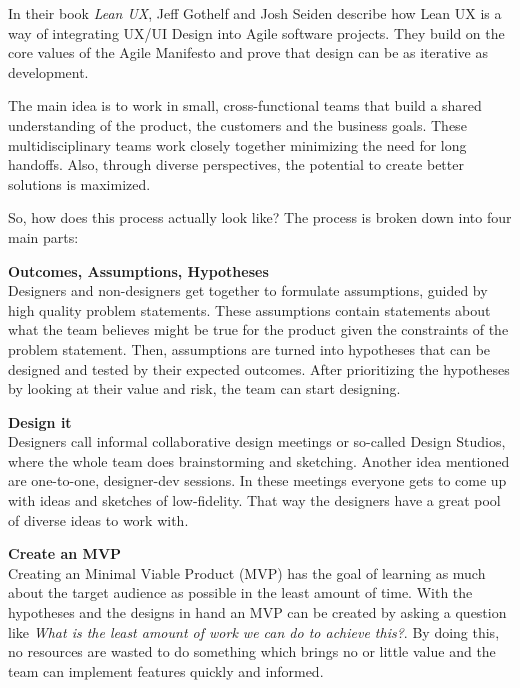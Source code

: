 In their book \textit{Lean UX}, Jeff Gothelf and Josh Seiden describe how Lean UX is a way of
integrating UX/UI Design into Agile software projects. They build on the core values of the Agile
Manifesto and prove that design can be as iterative as development.

The main idea is to work in small, cross-functional teams that build a shared understanding of the
product, the customers and the business goals. These multidisciplinary teams work closely together
minimizing the need for long handoffs. Also, through diverse perspectives, the potential to create
better solutions is maximized. 

So, how does this process actually look like? The process is broken down into four main parts:


\textbf{Outcomes, Assumptions, Hypotheses} \\ %
Designers and non-designers get together to formulate assumptions, guided by high quality problem
statements. These assumptions contain statements about what the team believes might be true for the
product given the constraints of the problem statement. Then, assumptions are turned into hypotheses
that can be designed and tested by their expected outcomes. After prioritizing the hypotheses by
looking at their value and risk, the team can start designing.

\textbf{Design it} \\
Designers call informal collaborative design meetings or so-called Design Studios, where the whole
team does brainstorming and sketching. Another idea mentioned are one-to-one, designer-dev sessions.
In these meetings everyone gets to come up with ideas and sketches of low-fidelity. That way the
designers have a great pool of diverse ideas to work with.

\textbf{Create an MVP} \\
Creating an Minimal Viable Product (MVP) has the goal of learning as much about the target audience
as possible in the least amount of time. With the hypotheses and the designs in hand an MVP can be
created by asking a question like \textit{What is the least amount of work we can do to achieve
    this?}. By doing this, no resources are wasted to do something which brings no or little value and
the team can implement features quickly and informed.

